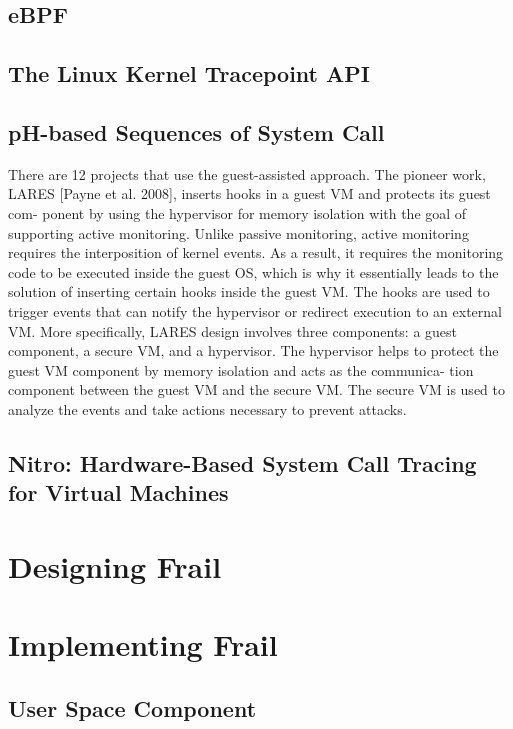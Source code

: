 \documentclass{report}
\begin{document}
\begin{spacing}{1.5}
\section{eBPF}
\section{The Linux Kernel Tracepoint API}
\section{pH-based Sequences of System Call}



{\large


There are 12 projects that use the guest-assisted approach. The pioneer
work, LARES [Payne et al. 2008], inserts hooks in a guest VM and protects its guest com-
ponent by using the hypervisor for memory isolation with the goal of supporting active
monitoring. Unlike passive monitoring, active monitoring requires the interposition of kernel events. As a result, it requires the monitoring code to be executed inside the guest OS, which is why it essentially leads to the solution of inserting certain hooks inside the guest VM. The hooks are used to trigger events that can notify the hypervisor
or redirect execution to an external VM. More specifically, LARES design involves three
components: a guest component, a secure VM, and a hypervisor. The hypervisor helps
to protect the guest VM component by memory isolation and acts as the communica-
tion component between the guest VM and the secure VM. The secure VM is used to
analyze the events and take actions necessary to prevent attacks.


}

\section{Nitro: Hardware-Based System Call Tracing for Virtual Machines}

\chapter{Designing Frail}
\chapter{Implementing Frail}

\section{User Space Component}

\end{spacing}
\end{document}
